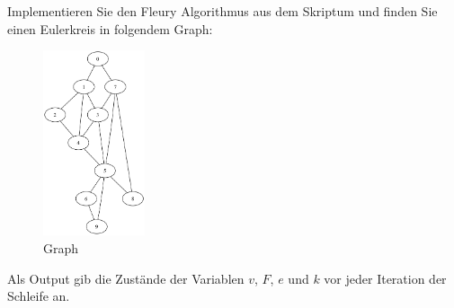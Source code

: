 \documentclass[a4paper,11pt]{report}
\begin{document}
Implementieren Sie den Fleury Algorithmus aus dem Skriptum und finden Sie einen Eulerkreis in folgendem Graph:
\begin{figure}[htbp]
    \centering
    \includegraphics[width=3cm]{notebook/assets/aufgabe_07_graph.png}
    \caption{Graph}
    \label{fig:eulerkreis_graph}
\end{figure}

Als Output gib die Zustände der Variablen $v$, $F$, $e$ und $k$ vor jeder Iteration der Schleife an.
\end{document}
